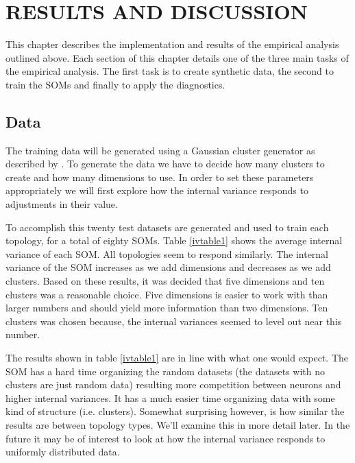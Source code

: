 \chapter{RESULTS AND DISCUSSION}
This chapter describes the implementation and results of the empirical analysis
outlined above.  Each section of this chapter details one of the three main
tasks of the empirical analysis.  The first task is to create synthetic data,
the second to train the SOMs and finally to apply the diagnostics.

\section{Data}
The training data will be generated using a Gaussian cluster generator as
described by \cite{handl}.  To generate the data we have to decide how many
clusters to create and how many dimensions to use.  In order to set these
parameters appropriately we will first explore how the internal variance
responds to adjustments in their value.

To accomplish this twenty test datasets are generated and used to train each
topology, for a total of eighty SOMs. Table \ref{ivtable1} shows the average
internal variance of each SOM.  All topologies seem to respond similarly. The
internal variance of the SOM increases as we add dimensions and decreases as
we add clusters. Based on these results, it was decided that five dimensions
and ten clusters was a reasonable choice. Five dimensions is easier to work
with than larger numbers and should yield more information than two
dimensions. Ten clusters was chosen because, the internal variances seemed to
level out near this number.

The results shown in table \ref{ivtable1} are in line with what one would
expect.  The SOM has a hard time organizing the random datasets (the datasets
with no clusters are just random data) resulting more competition between
neurons and higher internal variances. It has a much easier time organizing
data with some kind of structure (i.e. clusters).  Somewhat surprising
however, is how similar the results are between topology types.  We'll examine
this in more detail later.  In the future it may be of interest to look at how the
internal variance responds to uniformly distributed data.

